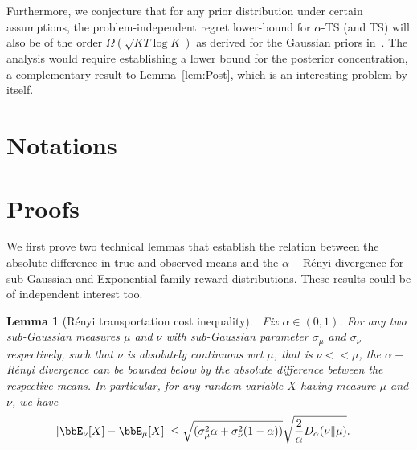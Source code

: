 \documentclass[11pt]{article}
\newtheorem{lemma}[theorem]{Lemma}
\begin{document}
Furthermore, we conjecture that for any prior distribution under certain assumptions, the problem-independent regret lower-bound for $\alpha$-TS (and TS) will also be of the order $\Omega(\sqrt{K T \log K })$ as derived for the Gaussian priors in~\cite{agrawal2013further}. The analysis would require establishing a lower bound for the posterior concentration, a complementary result to Lemma~\ref{lem:Post}, which is an interesting problem by itself. 

 




\appendix
\makeatletter
\renewcommand\@seccntformat[1]{%
  \ifnum\pdf@strcmp{#1}{section}=0 \appendixname~\csname the#1\endcsname.\quad
  \else \csname the#1\endcsname\quad\fi}
\makeatother

\section{Notations}
\printnomenclature

\section{Proofs}\label{app:Proofs}

We first prove two technical lemmas that establish the relation between the absolute difference in true and observed means and the $\alpha-$R\'enyi divergence for sub-Gaussian and Exponential family reward distributions. These results could be of independent interest too. 

\begin{lemma}[R\'enyi transportation cost inequality]~\label{lem:Pin}
    Fix $\alpha\in (0,1)$. For any two sub-Gaussian measures $\mu$ and $\nu$ with sub-Gaussian parameter $\sigma_{\mu}$ and $\sigma_{\nu}$ respectively, such that $\nu$ is absolutely continuous wrt $\mu$, that is $\nu << \mu$, the $\alpha-$R\'enyi divergence can be bounded below by the absolute difference between the respective means. In particular, for any random variable $X$ having measure $\mu$ and $\nu$, we have  
    \begin{align}
        |\bbE_{\nu}[X]-\bbE_{\mu}[X]  | &\leq \sqrt{(\sigma_{\mu}^2\alpha+\sigma_{\nu}^2(1-\alpha))} \sqrt{\frac{2}{\alpha} D_{\alpha}(\nu\|\mu) }.
        \end{align} 
\end{lemma}
\end{document}
